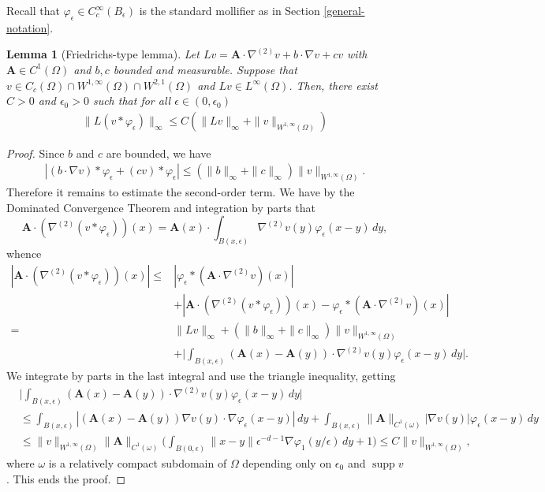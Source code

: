\documentclass[12pt,a4paper]{amsart}
\newtheorem{lemma}[theorem]{\bf Lemma}
\theoremstyle{definition}
\newcommand{\supp}{\operatorname{supp }}
\newcommand{\A}{\mathbf{A}}
\begin{document}
Recall that $\varphi_\epsilon\in C_c^\infty(B_\epsilon)$ is the standard  mollifier as in Section \ref{general-notation}.

\begin{lemma}[Friedrichs-type lemma]\label{lem:Friedrichs}
    Let $Lv = \A \cdot \nabla^{(2)}v + b\cdot\nabla v + cv$ with $\A \in C^1(\Omega)$ and $b,c$ bounded and measurable. Suppose that $v\in C_c(\Omega)\cap W^{1,\infty}(\Omega)\cap W^{2,1}(\Omega)$ and $Lv\in L^\infty(\Omega)$. Then, there exist $C>0$ and $\epsilon_0>0$ such that for all $\epsilon\in (0,\epsilon_0)$
    \begin{align*}
        \|L(v\ast \varphi_\epsilon)\|_\infty \leq  C(\|Lv\|_\infty + \|v\|_{W^{1,\infty}(\Omega)})
    \end{align*}
\end{lemma}
\begin{proof}
    Since $b$ and $c$ are bounded, we have 
    \begin{align*}
        |(b\cdot\nabla v)\ast \varphi_\epsilon + (cv)\ast\varphi_\epsilon| \leq (\|b\|_\infty + \|c\|_\infty)\|v\|_{W^{1,\infty}(\Omega)}.
    \end{align*}
    Therefore it remains to estimate the second-order term. We have by the Dominated Convergence Theorem and integration by parts that
    \begin{equation*}
        \A \cdot (\nabla^{(2)}(v\ast \varphi_\epsilon))(x) = \A(x) \cdot \int_{B(x,\epsilon)} \nabla^{(2)}v(y) \varphi_\epsilon(x-y) \, dy,
    \end{equation*}
    whence    
    \begin{align*}
        |\A \cdot (\nabla^{(2)}(v\ast \varphi_\epsilon))(x)| \leq& |\varphi_\epsilon\ast (\A \cdot \nabla^{(2)}v)(x)| \\ 
        &+ |\A \cdot (\nabla^{(2)}(v\ast\varphi_\epsilon))(x) - \varphi_\epsilon\ast (\A \cdot \nabla^{(2)}v)(x)|\\
        =&\|Lv\|_\infty + (\|b\|_\infty + \|c\|_\infty)\|v\|_{W^{1,\infty}(\Omega)} \\
        &+ \bigg|\int_{B(x,\epsilon)} (\A(x) - \A(y)) \cdot \nabla^{(2)}v(y) \varphi_\epsilon(x-y)\, dy\bigg|.
    \end{align*}
      We integrate by parts in the last integral and use the triangle inequality, getting
    \begin{align*}
        &\bigg|\int_{B(x,\epsilon)} (\A(x) - \A(y))\cdot\nabla^{(2)}v(y) \varphi_\epsilon(x-y)\, dy\bigg| \\ &\leq\int_{B(x,\epsilon)} |(\A(x) - \A (y))\nabla v(y) \cdot \nabla \varphi_\epsilon(x-y)|\, dy 
        + \int_{B(x,\epsilon)} \|\A\|_{C^1(\omega)}|\nabla v(y)|\varphi_\epsilon(x-y)\, dy\\
        &\leq \|v\|_{W^{1,\infty}(\Omega)}\|\A\|_{C^1(\omega)}\bigg(\int_{B(0,\epsilon)} \|x-y\|\epsilon^{-d-1} \nabla \varphi_1(y/\epsilon)\, dy + 1\bigg) 
        \leq C\|v\|_{W^{1,\infty}(\Omega)},
    \end{align*}
    where $\omega$ is a relatively compact subdomain of $\Omega$ depending only on $\epsilon_0$ and $\supp v$. This ends the proof.
\end{proof}
\end{document}
